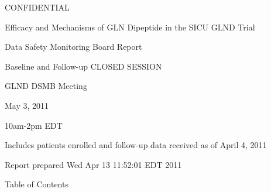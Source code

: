 \documentclass[dvips, 10pt]{article}
\begin{document}
\vspace*{1in}
\begin{center}
{\Huge{CONFIDENTIAL}}
\end{center}
\vspace*{0.5in}
\begin{center}
{\Huge{Efficacy and Mechanisms of GLN Dipeptide in the SICU GLND Trial}}
\end{center}
\vspace*{0.5in}
\begin{center}
{\Huge{Data Safety Monitoring Board Report}}
\end{center}
\vspace*{0.25in}
\begin{center}
{\Huge{
Baseline and Follow-up CLOSED SESSION
}}
\end{center}
\vspace*{1in}
\begin{center}
{\Huge{GLND DSMB Meeting}}
\end{center}
\begin{center}
{\Huge{
May 3, 2011
}}
\end{center}
\begin{center}
{\Huge{10am-2pm EDT}}
\end{center}
\vspace*{1in}
\begin{center}
\noindent
{\Large{Includes patients enrolled and follow-up data received as of April 4, 2011}}
\end{center}
\vspace*{0.5in}
\begin{center}
{\Large{Report prepared  Wed Apr 13 11:52:01 EDT 2011 }}
\end{center}
\clearpage
\vspace*{1in}
\begin{center}
{\Huge{Table of Contents}}
\end{center}
\listoftables
\listoffigures
\clearpage
\end{document}
